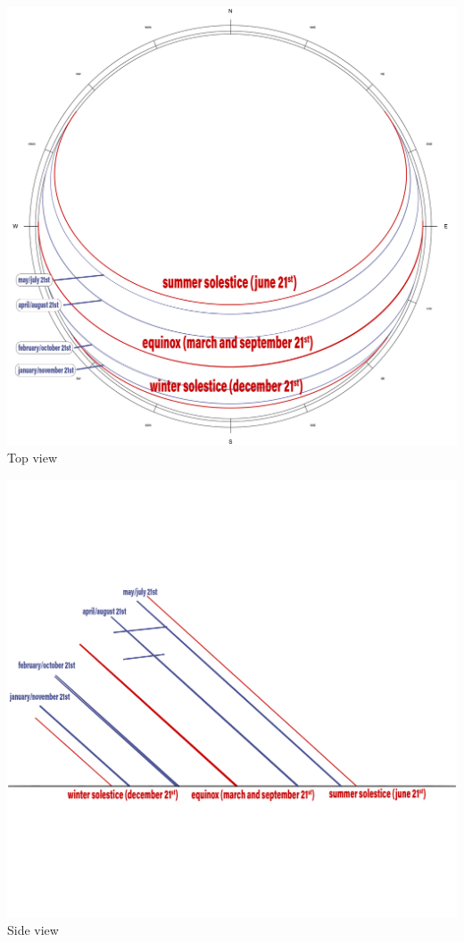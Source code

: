 \documentclass[a4paper,9pt]{article}
\begin{document}
\begin{minipage}{0.28\linewidth}
    \centering
    \includegraphics[width=\linewidth]{Images/sunpath_1.jpg}
  \\{Top view}
    \label{sunpath}
\end{minipage}
\hfill
\begin{minipage}{0.28\linewidth}
    \centering
    \includegraphics[width=\linewidth]{Images/sunpath2_1.jpg}
  \\{Side view}
     \label{sunpath1}
\end{minipage}
\end{document}
